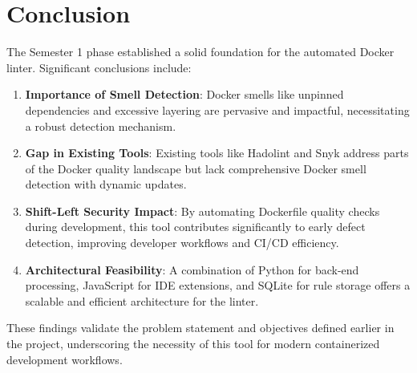 \section{Conclusion}
The Semester 1 phase established a solid foundation for the automated Docker linter. Significant conclusions include:
\begin{enumerate}
    \item \textbf{Importance of Smell Detection}: Docker smells like unpinned dependencies and excessive layering are pervasive and impactful, necessitating a robust detection mechanism.
    \item \textbf{Gap in Existing Tools}: Existing tools like Hadolint and Snyk address parts of the Docker quality landscape but lack comprehensive Docker smell detection with dynamic updates.
    \item \textbf{Shift-Left Security Impact}: By automating Dockerfile quality checks during development, this tool contributes significantly to early defect detection, improving developer workflows and CI/CD efficiency.
    \item \textbf{Architectural Feasibility}: A combination of Python for back-end processing, JavaScript for IDE extensions, and SQLite for rule storage offers a scalable and efficient architecture for the linter.
\end{enumerate}

These findings validate the problem statement and objectives defined earlier in the project, underscoring the necessity of this tool for modern containerized development workflows.

